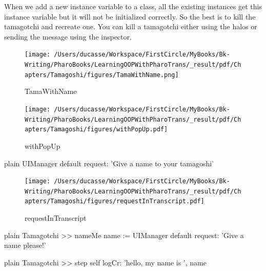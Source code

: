\documentclass[10pt,twoside,english]{_support/latex/sbabook/sbabook}
\begin{document}
When we add a new instance variable to a class, all the existing instances get this instance variable but it will not be initialized correctly. So the best is to kill the tamagotchi and recreate one. You can kill a tamagotchi either using the halos or sending the message  using the inspector. 


\begin{figure}

\begin{center}
\texttt{[image: /Users/ducasse/Workspace/FirstCircle/MyBooks/Bk-Writing/PharoBooks/LearningOOPWithPharoTrans/\_result/pdf/Chapters/Tamagoshi/figures/TamaWithName.png]}\caption{TamaWithName\label{TamaWithName}}\end{center}
\end{figure}



\begin{figure}

\begin{center}
\texttt{[image: /Users/ducasse/Workspace/FirstCircle/MyBooks/Bk-Writing/PharoBooks/LearningOOPWithPharoTrans/\_result/pdf/Chapters/Tamagoshi/figures/withPopUp.pdf]}\caption{withPopUp\label{withPopUp}}\end{center}
\end{figure}


\begin{displaycode}{plain}
UIManager default request:  'Give a name to your tamagoshi' 
\end{displaycode}


\begin{figure}

\begin{center}
\texttt{[image: /Users/ducasse/Workspace/FirstCircle/MyBooks/Bk-Writing/PharoBooks/LearningOOPWithPharoTrans/\_result/pdf/Chapters/Tamagoshi/figures/requestInTranscript.pdf]}\caption{requestInTranscript\label{requestInTranscript}}\end{center}
\end{figure}


\begin{displaycode}{plain}
Tamagotchi >> nameMe
	name := UIManager default request: 'Give a name please!'
\end{displaycode}

\begin{displaycode}{plain}
Tamagotchi >> step
	self logCr: 'hello, my name is ', name
\end{displaycode}
\end{document}
